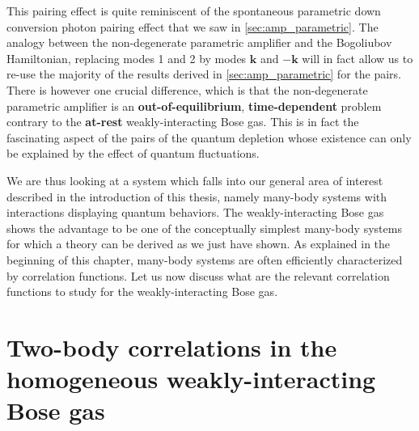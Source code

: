 This pairing effect is quite reminiscent of the spontaneous parametric down conversion photon pairing effect that we saw in \ref{sec:amp_parametric}. The analogy between the non-degenerate parametric amplifier and the Bogoliubov Hamiltonian, replacing modes 1 and 2 by modes $\bm{k}$ and $-\bm{k}$ will in fact allow us to re-use the majority of the results derived in \ref{sec:amp_parametric} for the \kmk pairs. There is however one crucial difference, which is that the non-degenerate parametric amplifier is an \textbf{out-of-equilibrium}, \textbf{time-dependent} problem contrary to the \textbf{at-rest} weakly-interacting Bose gas. This is in fact the fascinating aspect of the \kmk pairs of the quantum depletion whose existence can only be explained by the effect of quantum fluctuations.



We are thus looking at a system which falls into our general area of interest described in the introduction of this thesis, namely many-body systems with interactions displaying quantum behaviors. The weakly-interacting Bose gas shows the advantage to be one of the conceptually simplest many-body systems for which a theory can be derived as we just have shown. As explained in the beginning of this chapter, many-body systems are often efficiently characterized by correlation functions. Let us now discuss what are the relevant correlation functions to study for the weakly-interacting Bose gas.


\section{Two-body correlations in the homogeneous weakly-interacting Bose gas}


